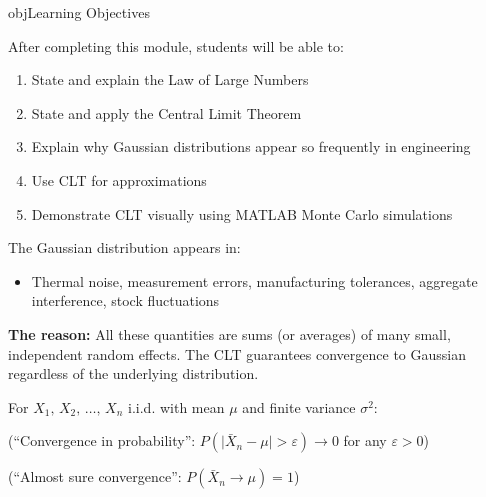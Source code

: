 \begin{PSbox}[unbreakable]{obj}{Learning Objectives}

After completing this module, students will be able to:

\begin{enumerate}
\def\labelenumi{\arabic{enumi}.}
\tightlist
\item
  State and explain the Law of Large Numbers
\item
  State and apply the Central Limit Theorem
\item
  Explain why Gaussian distributions appear so frequently in engineering
\item
  Use CLT for approximations
\item
  Demonstrate CLT visually using MATLAB Monte Carlo simulations
\end{enumerate}

\end{PSbox}


The Gaussian distribution appears in:

\begin{itemize}
\tightlist
\item
  Thermal noise, measurement errors, manufacturing tolerances, aggregate interference, stock fluctuations
\end{itemize}

\textbf{The reason:} All these quantities are sums (or averages) of many small, independent random effects. The CLT guarantees convergence to Gaussian regardless of the underlying distribution.



For $X_{1},\, X_{2},\, \ldots,\, X_{n}$ i.i.d. with mean $\mu$ and finite variance $\sigma^{2}$:


(``Convergence in probability'': $P(\lvert \bar{X}_{n} - \mu\rvert > \varepsilon) \to 0$ for any $\varepsilon > 0$)



(``Almost sure convergence'': $P(\bar{X}_{n} \to \mu) = 1$)


